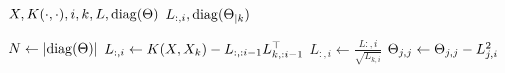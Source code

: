 \begin{algorithmic}[1]
  \REQUIRE \( X, K(\cdot, \cdot), i, k, L, \operatorname{diag}(\Theta) \)
  \ENSURE \( L_{:, i}, \operatorname{diag}(\Theta_{\mid k}) \)

  \STATE \( N \gets \lvert\operatorname{diag}(\Theta)\rvert \)
  \STATE \(
    L_{:, i} \gets
    K(X, X_k) - L_{:, :i - 1} L_{k, :i - 1}^{\top}
  \)
  \STATE \( L_{:, i} \gets \frac{L{:, i}}{\sqrt{L_{k, i}}} \)
    \STATE \( \Theta_{j, j} \gets \Theta_{j, j} - L_{j, i}^2 \)
  \ENDFOR
\end{algorithmic}
